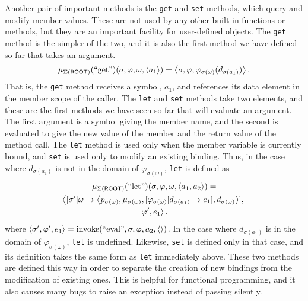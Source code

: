 \documentclass[twocolumn]{article}
\begin{document}
Another pair of important methods is the \texttt{get} and \texttt{set}
methods, which query and modify member values. These are not used by
any other built-in functions or methods, but they are an important
facility for user-defined objects. The \texttt{get} method is the
simpler of the two, and it is also the first method we have defined so
far that takes an argument.
\[ \mu_{\Sigma(\text{\sf ROOT})}(\text{``get''})(\sigma,\varphi,\omega,
\left< a_1\right>) = \left< \sigma, \varphi,
\varphi_{\sigma(\omega)}(d_{\sigma(a_1)})\right>.\] That is, the
\texttt{get} method receives a symbol, $a_1$, and references its data
element in the member scope of the caller. The \texttt{let} and
\texttt{set} methods take two elements, and these are the first
methods we have seen so far that will evaluate an argument. The first
argument is a symbol giving the member name, and the second is
evaluated to give the new value of the member and the return value of
the method call. The \texttt{let} method is used only when the member
variable is currently bound, and \texttt{set} is used only to modify
an existing binding. Thus, in the case where $d_{\sigma(a_1)}$ is not
in the domain of $\varphi_{\sigma(\omega)}$, \texttt{let} is defined
as
\begin{multline*}
  \mu_{\Sigma(\text{\sf ROOT})}(\text{``let''})(\sigma,\varphi,\omega,
  \left< a_1,a_2\right>) =\\ \left< [\sigma'|\omega\rightarrow \left< p_{\sigma(\omega)},
  \mu_{\sigma(\omega)},[\varphi_{\sigma(\omega)}|d_{\sigma(a_1)}\rightarrow e_1],
  d_{\sigma(\omega)}\right>],\right.\\\left.\varphi', e_1\right>.
\end{multline*}
where $\left< \sigma',\varphi',e_1 \right> = \operatorname{invoke}(\text{``eval''},\sigma,
\varphi, a_2, \left<\right>)$. In the case where $d_{\sigma(a_1)}$ is in the
domain of $\varphi_{\sigma(\omega)}$, \texttt{let} is
undefined. Likewise, \texttt{set} is defined only in that case, and
its definition takes the same form as \texttt{let} immediately
above. These two methods are defined this way in order to separate the
creation of new bindings from the modification of existing ones. This
is helpful for functional programming, and it also causes many bugs to
raise an exception instead of passing silently.
\end{document}
